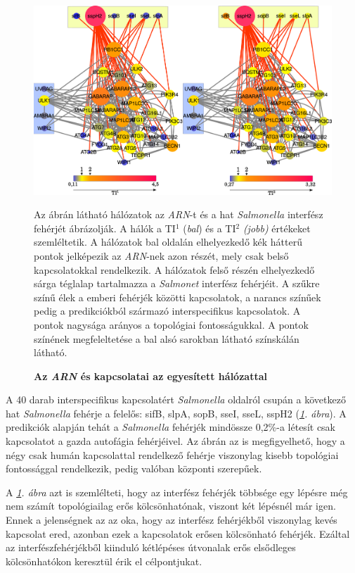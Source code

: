 \documentclass[a4paper,12pt]{article}
\newenvironment{imgdesc}{
		\small
		\singlespacing
		\begin{center}
		
	}{
		\end{center}	
	}
\begin{document}
				\begin{figure}[H]
					\includegraphics[scale=0.4]{img/connection_prots_v2_complete.pdf}
					\centering
					\caption{ \textbf{Az \textit{ARN} és kapcsolatai az egyesített hálózattal}}		
					\label{fig:connection}
					\begin{imgdesc}
					Az ábrán látható hálózatok az \textit{ARN}-t és a hat \textit{Salmonella} interfész fehérjét ábrázolják. A hálók a TI$^1$ (\textit{bal}) és a TI$^2$ \textit{(jobb)} értékeket szemléltetik. A hálózatok bal oldalán elhelyezkedő kék hátterű pontok jelképezik az \textit{ARN}-nek azon részét, mely csak belső kapcsolatokkal rendelkezik. A hálózatok felső részén elhelyezkedő sárga téglalap tartalmazza a \textit{Salmonet} interfész fehérjéit. A szűkre színű élek a emberi fehérjék közötti kapcsolatok, a narancs színűek pedig a predikciókból származó interspecifikus kapcsolatok. A pontok nagysága arányos a topológiai fontosságukkal. A pontok színének megfeleltetése a bal alsó sarokban látható színskálán látható. 
					\end{imgdesc}			 		 
				\end{figure}

				
		 A 40 darab interspecifikus kapcsolatért \textit{Salmonella} oldalról csupán a következő hat \textit{Salmonella} fehérje a felelős: sifB, slpA, sopB, sseI, sseL, sspH2 (\textit{\ref{fig:connection}. ábra}). A predikciók alapján tehát a \textit{Salmonella} fehérjék mindössze 0,2\%-a létesít csak kapcsolatot a gazda autofágia fehérjéivel. Az ábrán az is megfigyelhető, hogy a négy csak humán kapcsolattal rendelkező fehérje viszonylag kisebb topológiai fontossággal rendelkezik, pedig valóban központi szerepűek.
		 
		 A \textit{\ref{fig:connection}. ábra} azt is szemlélteti, hogy az interfész fehérjék többsége egy lépésre még nem számít topológiailag erős kölcsönhatónak, viszont két lépésnél már igen. Ennek a jelenségnek az az oka, hogy az interfész fehérjékből viszonylag kevés kapcsolat ered, azonban ezek a kapcsolatok erősen kölcsönható fehérjék. Ezáltal az interfészfehérjékből kiinduló kétlépéses útvonalak erős elsődleges kölcsönhatókon keresztül érik el célpontjukat.
		
\end{document}
